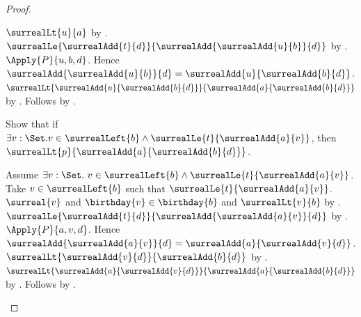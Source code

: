 \begin{proof}
\begin{subproof}
\begin{subproof}
\begin{byCase}
\begin{subproof}
                            $\surrealLt{u}{a}$
                            by .
                        $\surrealLe{\surrealAdd{t}{d}}
                            {\surrealAdd{\surrealAdd{u}{b}}{d}}$
                            by .
                        $\Apply{P}{u,b,d}$.
                        Hence $\surrealAdd{\surrealAdd{u}{b}}{d}=
                            \surrealAdd{u}{\surrealAdd{b}{d}}$.
                        $\surrealLt{\surrealAdd{u}{\surrealAdd{b}{d}}}
                            {\surrealAdd{a}{\surrealAdd{b}{d}}}$
                            by .
                        Follows by .
                    \end{subproof}
                    Show that if $\exists v:\Set.
                            v\in\surrealLeft{b}\land
                            \surrealLe{t}{\surrealAdd{a}{v}}$, then
                        $\surrealLt{p}{\surrealAdd{a}{\surrealAdd{b}{d}}}$.
                    \begin{subproof}
                        Assume $\exists v:\Set.\ v\in\surrealLeft{b}\land
                            \surrealLe{t}{\surrealAdd{a}{v}}$.
                        Take $v\in\surrealLeft{b}$ such that
                            $\surrealLe{t}{\surrealAdd{a}{v}}$.
                        $\surreal{v}$ and $\birthday{v}\in\birthday{b}$ and
                            $\surrealLt{v}{b}$
                            by .
                        $\surrealLe{\surrealAdd{t}{d}}
                            {\surrealAdd{\surrealAdd{a}{v}}{d}}$
                            by .
                        $\Apply{P}{a,v,d}$.
                        Hence $\surrealAdd{\surrealAdd{a}{v}}{d}=
                            \surrealAdd{a}{\surrealAdd{v}{d}}$.
                        $\surrealLt{\surrealAdd{v}{d}}
                            {\surrealAdd{b}{d}}$
                            by .
                        $\surrealLt{\surrealAdd{a}{\surrealAdd{v}{d}}}
                            {\surrealAdd{a}{\surrealAdd{b}{d}}}$
                            by .
                        Follows by .
                    \end{subproof}
\end{byCase}
\end{subproof}
\end{subproof}
\end{proof}

